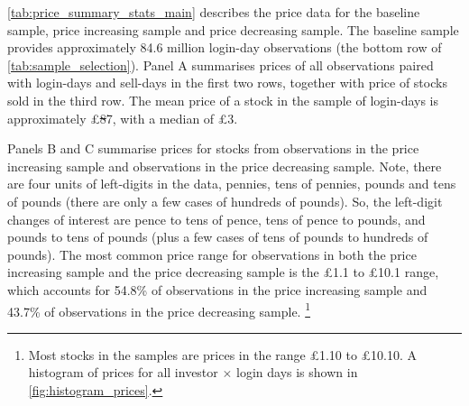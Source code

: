 \ref{tab:price_summary_stats_main} describes the price data for the baseline sample, price increasing sample and price decreasing sample. The baseline sample provides approximately 84.6 million login-day observations (the bottom row of \ref{tab:sample_selection}). Panel A summarises prices of all observations paired with login-days and sell-days in the first two rows, together with price of stocks sold in the third row. The mean price of a stock in the sample of login-days is approximately \pounds\st{8}7, with a median of \pounds3. 

Panels B and C summarise prices for stocks from observations in the price increasing sample and observations in the price decreasing sample. Note, there are four units of left-digits in the data, pennies, tens of pennies, pounds and tens of pounds (there are only a few cases of hundreds of pounds). So, the left-digit changes of interest are pence to tens of pence, tens of pence to pounds, and pounds to tens of pounds (plus a few cases of tens of pounds to hundreds of pounds). The most common price range for observations in both the price increasing sample and the price decreasing sample is the \pounds1.1 to \pounds10.1 range, which accounts for 54.8\% of observations in the price increasing sample and 43.7\% of observations in the price decreasing sample. \footnote{Most stocks in the samples are prices in the range \pounds1.10 to \pounds10.10. A histogram of prices for all investor $\times$ login days is shown in \ref{fig:histogram_prices}.}


